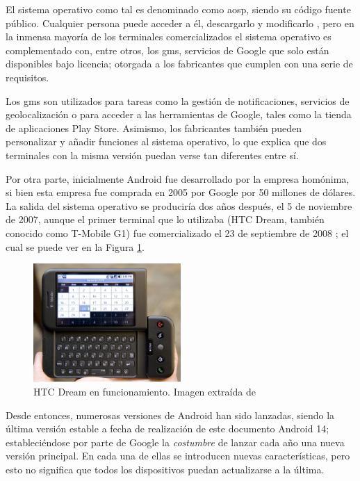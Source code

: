         El sistema operativo como tal es denominado como \gls{aosp}, siendo su código fuente público. Cualquier persona puede acceder a él, descargarlo y modificarlo \cite{collado_que_2022}, pero en la inmensa mayoría de los terminales comercializados el sistema operativo es complementado con, entre otros, los \gls{gms}, servicios de Google que solo están disponibles bajo licencia; otorgada a los fabricantes que cumplen con una serie de requisitos. 

        Los \gls{gms} son utilizados para tareas como la gestión de notificaciones, servicios de geolocalización o para acceder a las herramientas de Google, tales como la tienda de aplicaciones Play Store. Asimismo, los fabricantes también pueden personalizar y añadir funciones al sistema operativo, lo que explica que dos terminales con la misma versión puedan verse tan diferentes entre sí. 
        
        Por otra parte, inicialmente Android fue desarrollado por la empresa homónima, si bien esta empresa fue comprada en 2005 por Google por 50 millones de dólares. La salida del sistema operativo se produciría dos años después, el 5 de noviembre de 2007, aunque el primer terminal que lo utilizaba (HTC Dream, también conocido como 
        T-Mobile G1) fue comercializado el 23 de septiembre de 2008 \cite{adeva_android_2023} \cite{marquez_asi_2022}; el cual se puede ver en la Figura \ref{figure:android:htc_dream}.

        \begin{figure}[h]
            \centering
            \includegraphics[width=0.5\textwidth]{figures/HTC Dream.jpg}
            \caption[HTC Dream en funcionamiento.]{HTC Dream en funcionamiento. Imagen extraída de \cite{oryl_t-mobile_2008}}
            \label{figure:android:htc_dream}
        \end{figure}

        Desde entonces, numerosas versiones de Android han sido lanzadas, siendo la última versión estable a fecha de realización de este documento Android 14; estableciéndose por parte de Google la \textit{costumbre} de lanzar cada año una nueva versión principal. En cada una de ellas se introducen nuevas características, pero esto no significa que todos los dispositivos puedan actualizarse a la última. 
        
